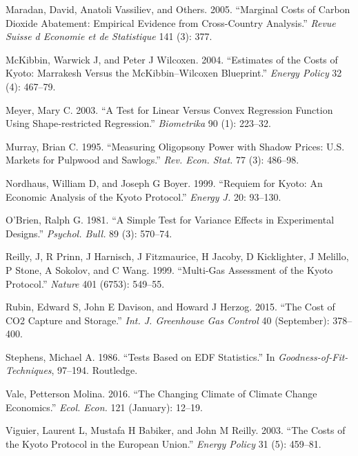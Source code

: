 \documentclass[
  10pt,
]{article}
\begin{document}
\leavevmode\hypertarget{ref-Maradan2005}{}%
Maradan, David, Anatoli Vassiliev, and Others. 2005. ``Marginal Costs of
Carbon Dioxide Abatement: Empirical Evidence from Cross-Country
Analysis.'' \emph{Revue Suisse d Economie et de Statistique} 141 (3):
377.

\leavevmode\hypertarget{ref-McKibbin2004}{}%
McKibbin, Warwick J, and Peter J Wilcoxen. 2004. ``Estimates of the
Costs of Kyoto: Marrakesh Versus the McKibbin--Wilcoxen Blueprint.''
\emph{Energy Policy} 32 (4): 467--79.

\leavevmode\hypertarget{ref-Meyer2003}{}%
Meyer, Mary C. 2003. ``A Test for Linear Versus Convex Regression
Function Using Shape‐restricted Regression.'' \emph{Biometrika} 90 (1):
223--32.

\leavevmode\hypertarget{ref-Murray1995}{}%
Murray, Brian C. 1995. ``Measuring Oligopsony Power with Shadow Prices:
U.S. Markets for Pulpwood and Sawlogs.'' \emph{Rev. Econ. Stat.} 77 (3):
486--98.

\leavevmode\hypertarget{ref-Nordhaus1999}{}%
Nordhaus, William D, and Joseph G Boyer. 1999. ``Requiem for Kyoto: An
Economic Analysis of the Kyoto Protocol.'' \emph{Energy J.} 20: 93--130.

\leavevmode\hypertarget{ref-OBrien1981}{}%
O'Brien, Ralph G. 1981. ``A Simple Test for Variance Effects in
Experimental Designs.'' \emph{Psychol. Bull.} 89 (3): 570--74.

\leavevmode\hypertarget{ref-Reilly1999}{}%
Reilly, J, R Prinn, J Harnisch, J Fitzmaurice, H Jacoby, D Kicklighter,
J Melillo, P Stone, A Sokolov, and C Wang. 1999. ``Multi-Gas Assessment
of the Kyoto Protocol.'' \emph{Nature} 401 (6753): 549--55.

\leavevmode\hypertarget{ref-Rubin2015}{}%
Rubin, Edward S, John E Davison, and Howard J Herzog. 2015. ``The Cost
of CO2 Capture and Storage.'' \emph{Int. J. Greenhouse Gas Control} 40
(September): 378--400.

\leavevmode\hypertarget{ref-Stephens1986}{}%
Stephens, Michael A. 1986. ``Tests Based on EDF Statistics.'' In
\emph{Goodness-of-Fit-Techniques}, 97--194. Routledge.

\leavevmode\hypertarget{ref-Vale2016}{}%
Vale, Petterson Molina. 2016. ``The Changing Climate of Climate Change
Economics.'' \emph{Ecol. Econ.} 121 (January): 12--19.

\leavevmode\hypertarget{ref-Viguier2003}{}%
Viguier, Laurent L, Mustafa H Babiker, and John M Reilly. 2003. ``The
Costs of the Kyoto Protocol in the European Union.'' \emph{Energy
Policy} 31 (5): 459--81.
\end{document}
